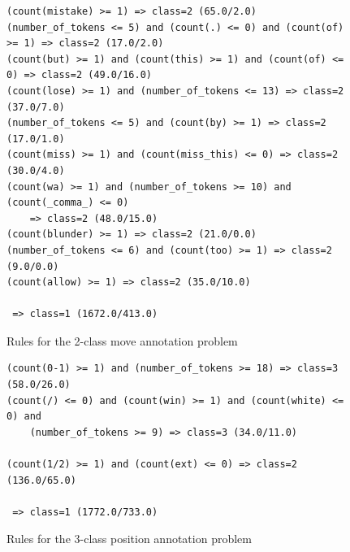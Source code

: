 \documentclass[article,type=msc,colorback,accentcolor=tud7b]{tudthesis}
\begin{document}
	\begin{figure}[H]
	  \centering
	  \begin{lstlisting}	  
(count(mistake) >= 1) => class=2 (65.0/2.0)
(number_of_tokens <= 5) and (count(.) <= 0) and (count(of) >= 1) => class=2 (17.0/2.0)
(count(but) >= 1) and (count(this) >= 1) and (count(of) <= 0) => class=2 (49.0/16.0)
(count(lose) >= 1) and (number_of_tokens <= 13) => class=2 (37.0/7.0)
(number_of_tokens <= 5) and (count(by) >= 1) => class=2 (17.0/1.0)
(count(miss) >= 1) and (count(miss_this) <= 0) => class=2 (30.0/4.0)
(count(wa) >= 1) and (number_of_tokens >= 10) and (count(_comma_) <= 0) 
	=> class=2 (48.0/15.0)
(count(blunder) >= 1) => class=2 (21.0/0.0)
(number_of_tokens <= 6) and (count(too) >= 1) => class=2 (9.0/0.0)
(count(allow) >= 1) => class=2 (35.0/10.0)

 => class=1 (1672.0/413.0)
	  \end{lstlisting}
      \caption{Rules for the 2-class move annotation problem}
      \label{fig:move_rules}
	\end{figure}
	
	\begin{figure}[H]
	  \centering
	  \begin{lstlisting}	  
(count(0-1) >= 1) and (number_of_tokens >= 18) => class=3 (58.0/26.0)
(count(/) <= 0) and (count(win) >= 1) and (count(white) <= 0) and 
	(number_of_tokens >= 9) => class=3 (34.0/11.0)
	
(count(1/2) >= 1) and (count(ext) <= 0) => class=2 (136.0/65.0)

 => class=1 (1772.0/733.0)
	  \end{lstlisting}
      \caption{Rules for the 3-class position annotation problem}
      \label{fig:position_rules}
	\end{figure}
	
\end{document}
